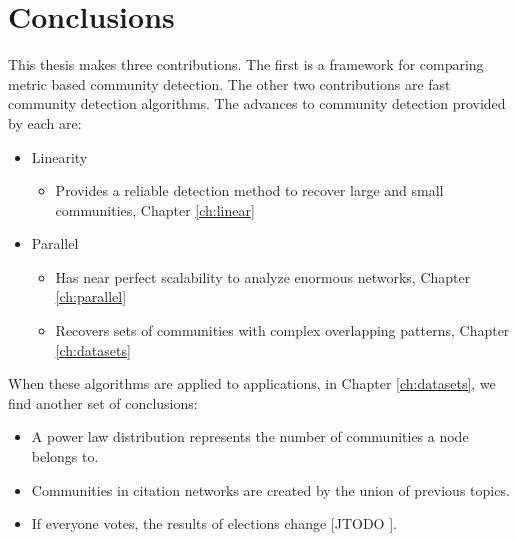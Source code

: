 \documentclass[phd,tocprelim]{cornell}
\begin{document}
\chapter{Conclusions}

This thesis makes three contributions.  The first is a framework for comparing metric based community detection.  The other two contributions are fast community detection algorithms.  The advances to community detection provided by each are:
\begin{itemize}
\item {\sc Linearity}
	\begin{itemize}
		\item Provides a reliable detection method to recover large and small communities, Chapter \ref{ch:linear}
	\end{itemize}
\item {\sc Parallel}
	\begin{itemize}
		\item Has near perfect scalability to analyze enormous networks, Chapter \ref{ch:parallel}
		\item Recovers sets of communities with complex overlapping patterns, Chapter \ref{ch:datasets}
	\end{itemize}
\end{itemize}

When these algorithms are applied to applications, in Chapter \ref{ch:datasets}, we find another set of conclusions:
\begin{itemize}
\item A power law distribution represents the number of communities a node belongs to.
\item Communities in citation networks are created by the union of previous topics.
\item If everyone votes, the results of elections change [JTODO ].
\end{itemize}




\end{document}
